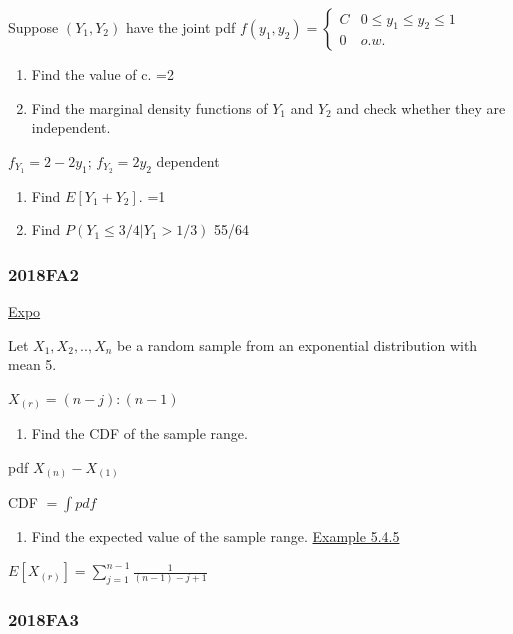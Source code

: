 \documentclass[10pt,twocolumn,portrait]{article}
\providecommand{\tightlist}{%
  \setlength{\itemsep}{0pt}\setlength{\parskip}{0pt}}
\begin{document}
Suppose \((Y_1,Y_2)\) have the joint pdf
\(f(y_1,y_2)=\begin{cases}C&0\le y_1\le y_2\le 1\\0& o.w.\end{cases}\)

\begin{enumerate}
\def\labelenumi{(\alph{enumi})}
\item
  Find the value of c. =2
\item
  Find the marginal density functions of \(Y_1\) and \(Y_2\) and check
  whether they are independent.
\end{enumerate}

\(f_{Y_1}=2-2y_1\); \(f_{Y_2}=2y_2\) dependent

\begin{enumerate}
\def\labelenumi{(\alph{enumi})}
\setcounter{enumi}{2}
\item
  Find \(E[Y_1+Y_2]\). =1
\item
  Find \(P(Y_1\le3/4|Y_1>1/3)\) 55/64
\end{enumerate}

\hypertarget{fa2-4}{%
\subsubsection{2018FA2}\label{fa2-4}}

\protect\hyperlink{Expo}{Expo}

Let \(X_1,X_2,..,X_n\) be a random sample from an exponential
distribution with mean 5.

\(X_{(r)}=(n-j):(n-1)\)

\begin{enumerate}
\def\labelenumi{(\alph{enumi})}
\tightlist
\item
  Find the CDF of the sample range.
\end{enumerate}

pdf \(X_{(n)}-X_{(1)}\)

CDF \(=\int pdf\)

\begin{enumerate}
\def\labelenumi{(\alph{enumi})}
\setcounter{enumi}{1}
\tightlist
\item
  Find the expected value of the sample range.
  \protect\hyperlink{range}{Example 5.4.5}
\end{enumerate}

\(E[X_{(r)}]=\sum_{j=1}^{n-1}\frac1{(n-1)-j+1}\)

\hypertarget{fa3-4}{%
\subsubsection{2018FA3}\label{fa3-4}}
\end{document}
